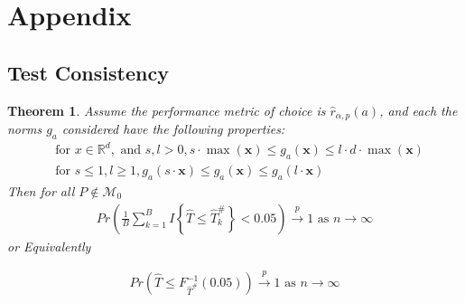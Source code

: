 \documentclass{article}
\newtheorem{theorem}{Theorem}
\begin{document}
\section{Appendix}

\subsection{Test Consistency}
\label{sec:test_cnsty}

\begin{theorem}
\label{thm:cnst}
Assume the performance metric of choice is $\hat{r}_{\alpha, p}(a)$, and each the norms $g_a$ considered have the following properties: 
\begin{align}
& \text{for } x \in \mathbb{R}^d, \text{ and } s, l > 0, s \cdot \max({\boldsymbol{x}}) \leq g_a(\boldsymbol{x}) \leq l \cdot d \cdot \max({\boldsymbol{x}}) \label{eqn:nrm_bounds}\\
& \text{for } s \leq 1, l \geq 1, g_a(s \cdot \boldsymbol{x}) \leq g_a(\boldsymbol{x}) \leq g_a(l \cdot \boldsymbol{x}) \label{eqn:linegrowth}
\end{align}
Then for all $P \not \in \mathscr{M}_0$ 
\begin{align*}
	Pr \left(\frac{1}{B}\sum_{k = 1}^B I\left\{\hat{T} \leq \hat{T}_k^{\#}\right\} < 0.05\right) \xrightarrow{p} 1 \text{ as } n \to \infty
\end{align*}
or Equivalently 

\begin{align*}
Pr\left(\hat{T} \leq F^{-1}_{\hat{T}^\#}(0.05)\right) \xrightarrow{p} 1 \text{ as } n \to \infty
\end{align*}
\end{theorem}
\end{document}
